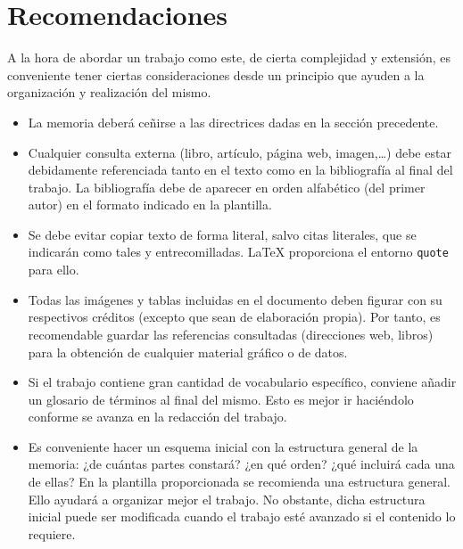 \section{Recomendaciones}
A la hora de abordar un trabajo como este, de cierta complejidad y extensión, es conveniente tener ciertas consideraciones desde un principio que ayuden a la organización y realización del mismo.
\begin{itemize}
    \item La memoria deberá ceñirse a las directrices dadas en la sección precedente.

    \item Cualquier consulta externa (libro, artículo, página web, imagen,\ldots) debe estar debidamente referenciada tanto en el texto como en la bibliografía al final del trabajo. La bibliografía debe de aparecer en orden alfabético (del primer autor) en el formato indicado en la plantilla.

    \item Se debe evitar copiar texto de forma literal, salvo citas literales, que se indicarán como tales y entrecomilladas. LaTeX proporciona el entorno \texttt{quote} para ello.

    \item Todas las imágenes y tablas incluidas en el documento deben figurar con su respectivos créditos (excepto que sean de elaboración propia). Por tanto, es recomendable guardar las referencias consultadas (direcciones web, libros) para la obtención de cualquier material gráfico o de datos.

    \item Si el trabajo contiene gran cantidad de vocabulario específico, conviene añadir un glosario de términos al final del mismo. Esto es mejor ir haciéndolo conforme se avanza en la redacción del trabajo.

    \item Es conveniente hacer un esquema inicial con la estructura general de la memoria: ¿de cuántas partes constará? ¿en qué orden? ¿qué incluirá cada una de ellas? En la plantilla proporcionada se recomienda una estructura general. Ello ayudará a organizar mejor el trabajo. No obstante, dicha estructura inicial puede ser modificada cuando el trabajo esté avanzado si el contenido lo requiere.
\end{itemize}
